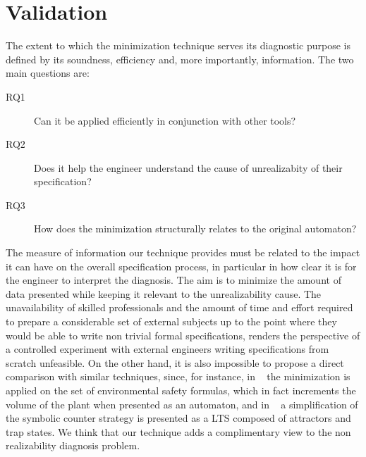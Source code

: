 \section{Validation}\label{sec:validation}
The extent to which the minimization technique serves its diagnostic purpose is defined by its soundness, efficiency and, more importantly, information. 
The two main questions are:
\begin{description}
	\item[RQ1] Can it be applied efficiently in conjunction with other tools?	
	\item[RQ2] Does it help the engineer understand the cause of unrealizabity of their specification?
	\item[RQ3] How does the minimization structurally relates to the original automaton?		
\end{description}



The measure of information our technique provides must be related to the impact it can have on the overall specification process, in particular in how clear it is for the engineer  to interpret the diagnosis. The aim is to minimize the amount of data presented while keeping it relevant to the unrealizability cause. The unavailability of skilled professionals and the amount of time and effort required to prepare a considerable set of external subjects up to the point where they would be able to write non trivial formal specifications, renders the perspective of a controlled experiment with external engineers writing specifications from scratch unfeasible. On the other hand, it is also impossible to propose a direct comparison with similar techniques, since, for instance, in ~\cite{DBLP:conf/hvc/KonighoferHB10} the minimization is applied on the set of environmental safety formulas, which in fact increments the volume of the plant when presented as an automaton, and in ~\cite{DBLP:conf/sigsoft/KuventMR17} a simplification of the symbolic counter strategy is presented as a LTS composed of attractors and trap states. We think that our technique adds a complimentary view to the non realizability diagnosis problem.


